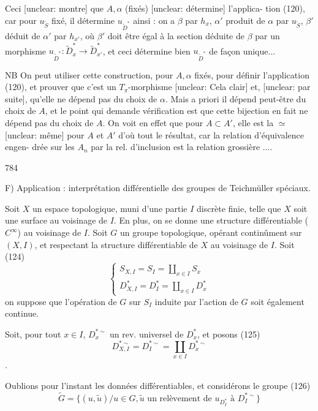\newpage


Ceci [unclear: montre] que $A, \alpha$ (fixés) [unclear: détermine] l'applica-
tion (120), car pour $u_{\tilde{S}}$ fixé, il détermine
$u_{\tilde{D}^*}$ ainsi : on a $\beta$ par $h_x$, $\alpha'$ produit de
$\alpha$ par $u_{\tilde{S}}$, $\beta'$ déduit de $\alpha'$ par $h_{x'}$, où
$\beta'$ doit être égal à la section déduite de
$\beta$ par un morphisme $u_{\tilde{D}^*} : \tilde{D}^*_x \to \tilde{D}^*_{x'}$, et ceci
détermine bien $u_{\tilde{D}^*}$ de façon unique...

NB On peut utiliser cette construction, pour
$A, \alpha$ fixés, pour définir l'application (120),
et prouver que c'est un $T_{\pi}$-morphisme
[unclear: Cela clair] et, [unclear: par suite], qu'elle ne
dépend pas du choix de $\alpha$. Mais a priori
il dépend peut-être du choix de $A$, et le
point qui demande vérification est que
cette bijection en fait ne dépend pas du
choix de $A$. On voit en effet que pour
$A \subset A'$, elle est la $\simeq$ [unclear: même] pour $A$ et $A'$ d'où
tout le résultat, car la relation d'équivalence engen-
drée sur les $A_n$ par la rel. d'inclusion est
la relation grossière ....

\newpage


784

F) Application : interprétation différentielle des groupes de Teichmüller spéciaux.

Soit $X$ un espace topologique, muni d'une partie $I$ discrète finie, telle que $X$ soit une surface au voisinage de $I$. En plus, on se donne une structure différentiable ($C^\infty$) au voisinage de $I$. Soit $G$ un groupe topologique, opérant continûment sur $(X,I)$, et respectant la structure différentiable de $X$ au voisinage de $I$. Soit
(124) $$ \begin{cases} S_{X,I} = S_I = \coprod_{x \in I} S_x \\ D_{X,I}^* = D_I^* = \coprod_{x \in I} D_x^* \end{cases} $$
on suppose que l'opération de $G$ sur $S_I$ induite par l'action de $G$ soit également continue.

Soit, pour tout $x \in I$, $D_x^{*\sim}$ un rev. universel de $D_x^*$, et posons
(125) $$D_{X,I}^{*\sim} = D_I^{*\sim} = \coprod_{x \in I} D_x^{*\sim}$$ .

Oublions pour l'instant les données différentiables, et considérons le groupe
(126) $$\tilde{G} = \{ (u, \tilde{u}) / u \in G, \tilde{u} \text{ un relèvement de } u_{D_I^*} \text{ à } D_I^{*\sim} \}$$

